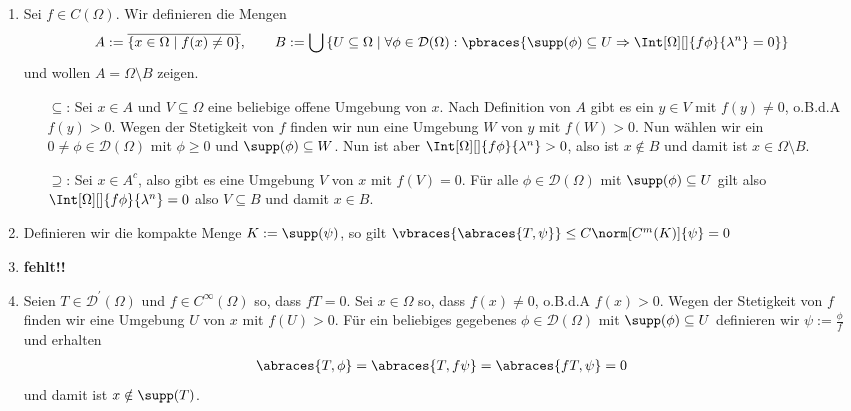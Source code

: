 \begin{solution}
\phantom{}
\begin{enumerate}[label = (\roman*)]
	\item Sei $f \in C(\Omega)$. Wir definieren die Mengen
	\begin{align*}
	A := \overline{\{x \in \Omega \mid f(x) \neq 0 \}}, \qquad B := \bigcup \left\{U \subseteq \Omega \mid \forall \phi \in \mathcal{D}(\Omega): \pbraces{\supp(\phi) \subseteq U \Rightarrow \Int[\Omega][]{f\phi}{\lambda^n} = 0} \right\}
	\end{align*}
	und wollen $A = \Omega \setminus B$ zeigen. 
	\begin{enumerate}
		\item[$\subseteq$:] Sei $x \in A$ und $V \subseteq \Omega$ eine beliebige offene Umgebung von $x$. Nach Definition von $A$ gibt es ein $y \in V$ mit $f(y) \neq 0$, o.B.d.A $f(y) > 0$. Wegen der Stetigkeit von $f$ finden wir nun eine Umgebung $W$ von $y$ mit $f(W) > 0$. Nun wählen wir ein $0 \neq \phi \in \mathcal{D}(\Omega)$ mit $\phi \geq 0$ und $\supp(\phi) \subseteq W$. Nun ist aber $\Int[\Omega][]{f\phi}{\lambda^n} > 0$, also ist $x \notin B$ und damit ist $x \in \Omega \setminus B$.
		\item[$\supseteq$:] Sei $x \in A^c$, also gibt es eine Umgebung $V$ von $x$ mit $f(V) = 0$. Für alle $\phi \in \mathcal{D}(\Omega)$ mit $\supp(\phi) \subseteq U$ gilt also $\Int[\Omega][]{f\phi}{\lambda^n} = 0$ also $V \subseteq B$ und damit $x \in B$. 
	\end{enumerate}
	\item Definieren wir die kompakte Menge $K := \supp(\psi)$, so gilt $\vbraces{\abraces{T, \psi}} \leq C \norm[C^m(K)]{\psi} = 0$
	\item \textbf{fehlt!!}
	\item Seien $T \in \mathcal{D}^\prime(\Omega)$ und $f \in C^\infty(\Omega)$ so, dass $fT = 0$. Sei $x \in \Omega$ so, dass $f(x) \neq 0$, o.B.d.A $f(x) > 0$. Wegen der Stetigkeit von $f$ finden wir eine Umgebung $U$ von $x$ mit $f(U) > 0$. Für ein beliebiges gegebenes $\phi \in \mathcal{D}(\Omega)$ mit $\supp(\phi) \subseteq U$ definieren wir $\psi := \frac{\phi}{f}$ und erhalten
	\begin{align*}
	\abraces{T, \phi} = \abraces{T, f\psi} = \abraces{fT, \psi} = 0
	\end{align*}
	und damit ist $x \notin \supp(T)$.
\end{enumerate}

\end{solution}

